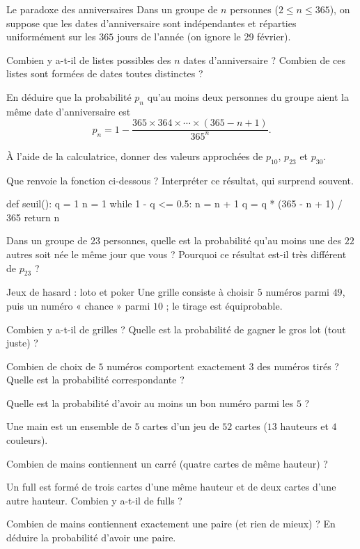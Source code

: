\begin{exercice}[3]{Le paradoxe des anniversaires}
Dans un groupe de $n$ personnes ($2\leq n\leq365$), on suppose que les dates d'anniversaire sont indépendantes et réparties
uniformément sur les $365$ jours de l'année (on ignore le 29 février).
\begin{questions}
  \item Combien y a-t-il de listes possibles des $n$ dates d'anniversaire ? Combien de ces listes sont formées de dates toutes distinctes ?
  \item En déduire que la probabilité $p_n$ qu'au moins deux personnes du groupe aient la même date d'anniversaire est
    \[ p_n=1-\frac{365\times364\times\cdots\times(365-n+1)}{365^{n}}. \]
  \item À l'aide de la calculatrice, donner des valeurs approchées de $p_{10}$, $p_{23}$ et $p_{30}$.
  \item Que renvoie la fonction ci-dessous ? Interpréter ce résultat, qui surprend souvent.
\begin{python}
def seuil():
    q = 1
    n = 1
    while 1 - q <= 0.5:
        n = n + 1
        q = q * (365 - n + 1) / 365
    return n
\end{python}
  \item Dans un groupe de $23$ personnes, quelle est la probabilité qu'au moins une des $22$ autres soit née le même jour que vous ?
    Pourquoi ce résultat est-il très différent de $p_{23}$ ?
\end{questions}
\end{exercice}

\begin{exercice}[3]{Jeux de hasard : loto et poker}
Une grille consiste à choisir $5$ numéros parmi $49$, puis un numéro « chance » parmi $10$ ; le tirage est équiprobable.
\begin{questions}
  \item Combien y a-t-il de grilles ? Quelle est la probabilité de gagner le gros lot (tout juste) ?
  \item Combien de choix de $5$ numéros comportent exactement $3$ des numéros tirés ? Quelle est la probabilité correspondante ?
  \item Quelle est la probabilité d'avoir au moins un bon numéro parmi les $5$ ?
\end{questions}
Une main est un ensemble de $5$ cartes d'un jeu de $52$ cartes ($13$ hauteurs et $4$ couleurs).
\begin{questions}[resume]
  \item Combien de mains contiennent un carré (quatre cartes de même hauteur) ?
  \item Un full est formé de trois cartes d'une même hauteur et de deux cartes d'une autre hauteur. Combien y a-t-il de fulls ?
  \item Combien de mains contiennent exactement une paire (et rien de mieux) ? En déduire la probabilité d'avoir une paire.
\end{questions}
\end{exercice}

